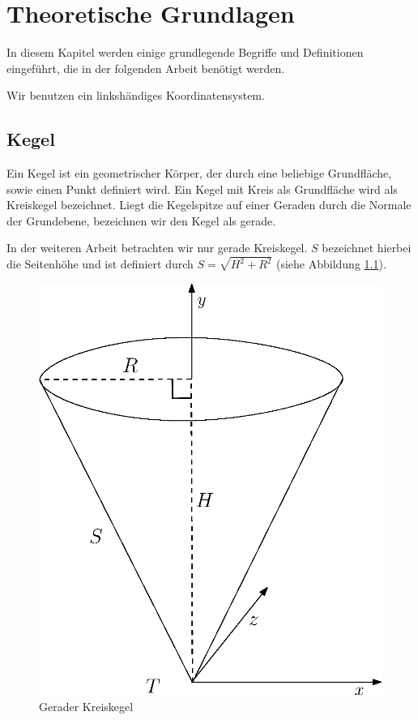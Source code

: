 \chapter{Theoretische Grundlagen}
\label{ch:theory}

In diesem Kapitel werden einige grundlegende Begriffe und Definitionen eingeführt, die in der folgenden Arbeit benötigt werden. 

Wir benutzen ein linkshändiges Koordinatensystem.


\section{Kegel}
\label{s:cone}

\begin{definition}[Kegel]
	Ein Kegel ist ein geometrischer Körper, der durch eine beliebige Grundfläche, sowie einen Punkt definiert wird.
	Ein Kegel mit Kreis als Grundfläche wird als Kreiskegel bezeichnet. Liegt die Kegelspitze auf einer Geraden durch die Normale der Grundebene, bezeichnen wir den Kegel als gerade.
\end{definition}

In der weiteren Arbeit betrachten wir nur gerade Kreiskegel.
$S$ bezeichnet hierbei die Seitenhöhe und ist definiert durch $S = \sqrt{H^2 + R^2}$ (siehe Abbildung \ref{fig:cone}).

\begin{figure}[!htb]
	\centering
	\includegraphics[scale=.5]{images/fullCone.eps}
	\caption{Gerader Kreiskegel}
	\label{fig:cone}
\end{figure}

